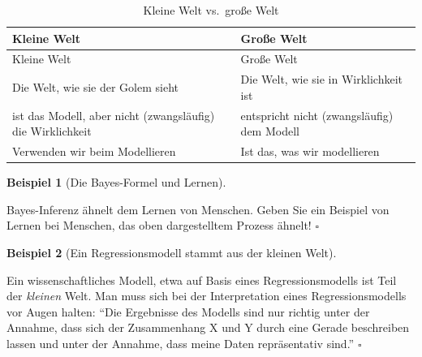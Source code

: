 \documentclass[
  ngerman,
  letterpaper,
  twoside,
  open=any]{scrbook}
\theoremstyle{definition}
\newtheorem{example}{Beispiel}[chapter]
\theoremstyle{plain}
\theoremstyle{definition}
\theoremstyle{definition}
\theoremstyle{definition}
\newtheorem{example}{Beispiel}[chapter]
\theoremstyle{definition}
\theoremstyle{remark}
\begin{document}
\begin{longtable}[]{@{}
  >{\raggedright\arraybackslash}p{}
  >{\raggedright\arraybackslash}p{}@{}}
\caption{Kleine Welt vs.~große
Welt}\label{tbl-klein-gross}\tabularnewline
\toprule\noalign{}
\begin{minipage}[b]{\linewidth}\raggedright
Kleine Welt
\end{minipage} & \begin{minipage}[b]{\linewidth}\raggedright
Große Welt
\end{minipage} \\
\midrule\noalign{}
\endfirsthead
\toprule\noalign{}
\begin{minipage}[b]{\linewidth}\raggedright
Kleine Welt
\end{minipage} & \begin{minipage}[b]{\linewidth}\raggedright
Große Welt
\end{minipage} \\
\midrule\noalign{}
\endhead
\bottomrule\noalign{}
\endlastfoot
Die Welt, wie sie der Golem sieht & Die Welt, wie sie in Wirklichkeit
ist \\
ist das Modell, aber nicht (zwangsläufig) die Wirklichkeit & entspricht
nicht (zwangsläufig) dem Modell \\
Verwenden wir beim Modellieren & Ist das, was wir modellieren \\
\end{longtable}

\begin{example}[Die Bayes-Formel und
Lernen]\protect\hypertarget{exm-bayes-lernen}{}\label{exm-bayes-lernen}

Bayes-Inferenz ähnelt dem Lernen von Menschen. Geben Sie ein Beispiel
von Lernen bei Menschen, das oben dargestelltem Prozess ähnelt!
\(\square\)

\end{example}

\begin{example}[Ein Regressionsmodell stammt aus der kleinen
Welt]\protect\hypertarget{exm-regr-grosse-welt}{}\label{exm-regr-grosse-welt}

Ein wissenschaftliches Modell, etwa auf Basis eines Regressionsmodells
ist Teil der \emph{kleinen} Welt. Man muss sich bei der Interpretation
eines Regressionsmodells vor Augen halten: \enquote{Die Ergebnisse des
Modells sind nur richtig unter der Annahme, dass sich der Zusammenhang X
und Y durch eine Gerade beschreiben lassen und unter der Annahme, dass
meine Daten repräsentativ sind.} \(\square\)

\end{example}
\end{document}
